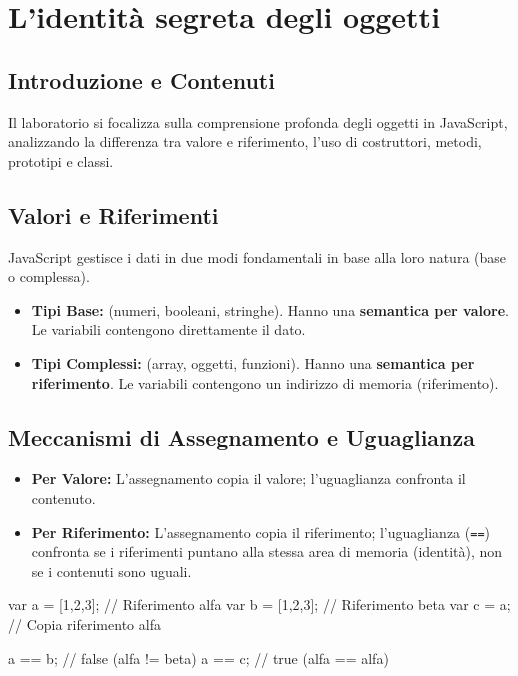 \section{L'identità segreta degli oggetti}

\subsection{Introduzione e Contenuti}
Il laboratorio si focalizza sulla comprensione profonda degli oggetti in JavaScript, analizzando la differenza tra valore e riferimento, l'uso di costruttori, metodi, prototipi e classi.

\subsection{Valori e Riferimenti}
JavaScript gestisce i dati in due modi fondamentali in base alla loro natura (base o complessa).

\begin{labdefinition}
    \begin{itemize}
        \item \textbf{Tipi Base:} (numeri, booleani, stringhe). Hanno una \textbf{semantica per valore}. Le variabili contengono direttamente il dato.
        \item \textbf{Tipi Complessi:} (array, oggetti, funzioni). Hanno una \textbf{semantica per riferimento}. Le variabili contengono un indirizzo di memoria (riferimento).
    \end{itemize}
\end{labdefinition}

\subsection{Meccanismi di Assegnamento e Uguaglianza}
\begin{itemize}
    \item \textbf{Per Valore:} L'assegnamento copia il valore; l'uguaglianza confronta il contenuto.
    \item \textbf{Per Riferimento:} L'assegnamento copia il riferimento; l'uguaglianza (\texttt{==}) confronta se i riferimenti puntano alla stessa area di memoria (identità), non se i contenuti sono uguali.
\end{itemize}

\begin{labjsbox}
var a = [1,2,3]; // Riferimento alfa
var b = [1,2,3]; // Riferimento beta
var c = a;       // Copia riferimento alfa

a == b; // false (alfa != beta)
a == c; // true  (alfa == alfa)
\end{labjsbox}

